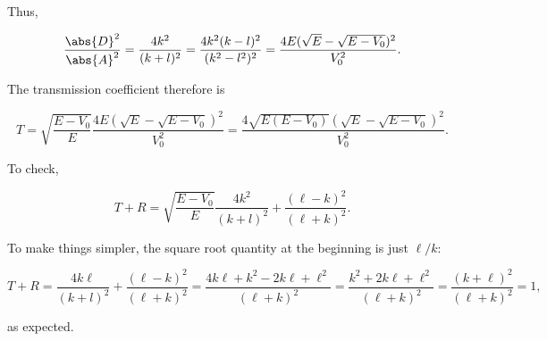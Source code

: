 \begin{parts}
Thus,

\begin{equation*}
    \frac{\abs{D}^2}{\abs{A}^2} = \frac{4k^2}{(k+l)^2} = \frac{4k^2(k-l)^2}{(k^2-l^2)^2} = \frac{4E(\sqrt{E} - \sqrt{E - V_0})^2}{V_0^2}.
\end{equation*}

The transmission coefficient therefore is

\begin{equation*}
    T = \sqrt{\frac{E - V_0}{E}} \frac{4E(\sqrt{E} - \sqrt{E - V_0})^2}{V_0^2} = \frac{4\sqrt{E(E-V_0)}(\sqrt{E} - \sqrt{E - V_0})^2}{V_0^2}.
\end{equation*}

To check,

\begin{equation*}
    T+R = \sqrt{\frac{E - V_0}{E}}\frac{4k^2}{(k+l)^2} + \frac{(\ell - k)^2}{(\ell + k)^2}.
\end{equation*}

To make things simpler, the square root quantity at the beginning is just $\ell/k$:

\begin{equation*}
    T+R = \frac{4k\ell}{(k+l)^2} + \frac{(\ell - k)^2}{(\ell + k)^2} = \frac{4k\ell + k^2 - 2k\ell + \ell^2}{(\ell + k)^2} = \frac{k^2 + 2k\ell + \ell^2}{(\ell + k)^2} = \frac{(k+\ell)^2}{(\ell + k)^2} = 1,
\end{equation*}

as expected.






\end{parts}
